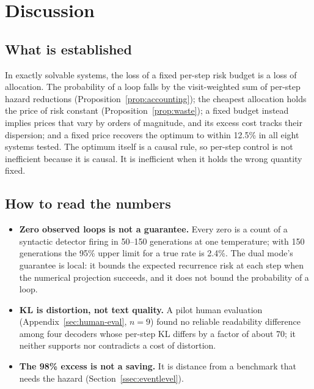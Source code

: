 \section{Discussion}\label{sec:discussion}

\subsection{What is established}
In exactly solvable systems, the loss of a fixed per-step risk budget is a loss of allocation. The probability of a loop falls by the visit-weighted sum of per-step hazard reductions (Proposition~\ref{prop:accounting}); the cheapest allocation holds the price of risk constant (Proposition~\ref{prop:waste}); a fixed budget instead implies prices that vary by orders of magnitude, and its excess cost tracks their dispersion; and a fixed price recovers the optimum to within 12.5\% in all eight systems tested. The optimum itself is a causal rule, so per-step control is not inefficient because it is causal. It is inefficient when it holds the wrong quantity fixed.

\subsection{How to read the numbers}
\begin{itemize}[leftmargin=*,itemsep=2pt]
\item \textbf{Zero observed loops is not a guarantee.} Every zero is a count of a syntactic detector firing in 50--150 generations at one temperature; with 150 generations the 95\% upper limit for a true rate is 2.4\%. The dual mode's guarantee is local: it bounds the expected recurrence risk at each step when the numerical projection succeeds, and it does not bound the probability of a loop.
\item \textbf{KL is distortion, not text quality.} A pilot human evaluation (Appendix~\ref{sec:human-eval}, $n=9$) found no reliable readability difference among four decoders whose per-step KL differs by a factor of about 70; it neither supports nor contradicts a cost of distortion.
\item \textbf{The 98\% excess is not a saving.} It is distance from a benchmark that needs the hazard (Section~\ref{ssec:eventlevel}).
\end{itemize}

